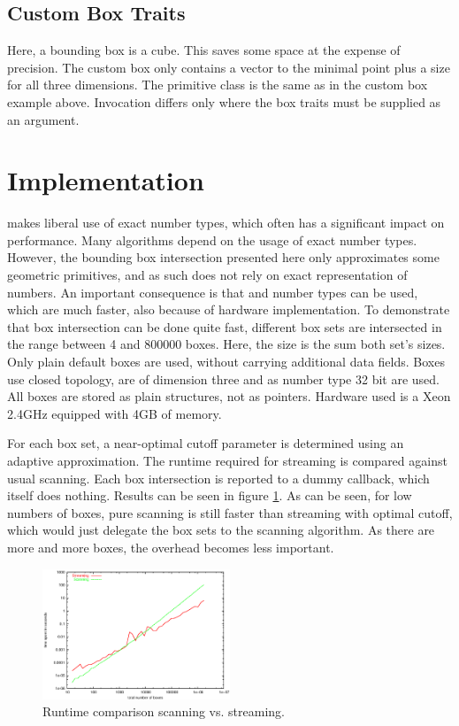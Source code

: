 
\subsection{Custom Box Traits }
Here, a bounding box is a cube. This saves some space at the expense of precision. The custom box only contains a vector to the minimal point plus a size for all three dimensions. The primitive class is the same as in the custom box example above. Invocation differs only where the box traits must be supplied as an argument.

\newpage
\section{Implementation}
\cgal{} makes liberal use of exact number types, which often has a significant impact on performance. Many algorithms depend on the usage of exact number types. However, 
the bounding box intersection presented here only approximates some geometric primitives, and as such does not rely on exact representation of numbers. An important consequence is that  and  number types can be used, which are much faster, also because of hardware implementation. To demonstrate that box intersection can be done quite fast, different box sets are intersected in the range between 4 and 800000 boxes. Here, the size is the sum both set's sizes. Only plain default boxes are used, without carrying additional data fields. Boxes use closed topology, are of dimension three and as number type 32 bit  are used. All boxes are stored as plain structures, not as pointers. Hardware used is a Xeon 2.4GHz equipped with 4GB of memory.

For each box set, a near-optimal cutoff parameter is determined using an adaptive approximation. The runtime required for streaming is compared against usual scanning. Each box intersection is reported to a dummy callback, which itself does nothing. Results can be seen in figure \ref{fig_benchmark}. As can be seen, for low numbers of boxes, pure scanning is still faster than streaming with optimal cutoff, which would just delegate the box sets to the scanning algorithm. As there are more and more boxes, the overhead becomes less important.

\begin{ccTexOnly}
 \begin{figure}
  \begin{center}
  \includegraphics[width=0.5\textwidth]{../../../test/Box_intersection_d/benchmark.eps}
  \caption{Runtime comparison scanning vs. streaming.}
  \label{fig_benchmark}
  \end{center}
 \end{figure}
\end{ccTexOnly}



